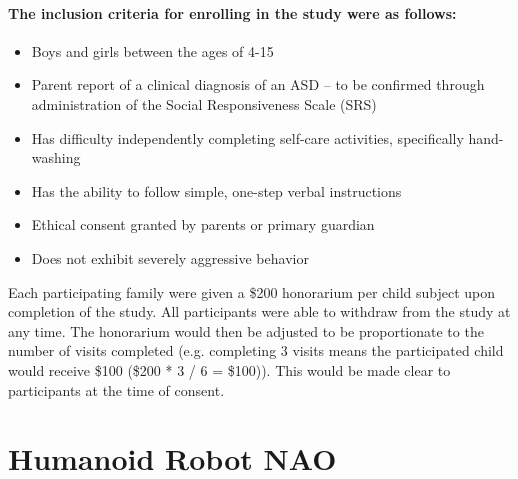 \documentclass{ut-thesis}
\begin{document}
\paragraph{The \textbf{inclusion criteria} for enrolling in the study were as follows:}
\begin{itemize}
	\item Boys and girls between the ages of 4-15
	\item Parent report of a clinical diagnosis of an ASD – to be confirmed through administration of the Social Responsiveness Scale (SRS)
	\item Has difficulty independently completing self-care activities, specifically hand-washing
	\item Has the ability to follow simple, one-step verbal instructions
	\item Ethical consent  granted by parents or primary guardian
	\item Does not exhibit severely aggressive behavior
\end{itemize}

Each participating family were given a \$200 honorarium per child subject upon completion of the study. All participants were able to withdraw from the study at any time. The honorarium would then be adjusted to be proportionate to the number of visits completed (e.g. completing 3 visits means the participated child would receive \$100 (\$200 * 3 / 6 = \$100)). This would be made clear to participants at the time of consent.
\section{Humanoid Robot NAO}
\end{document}
